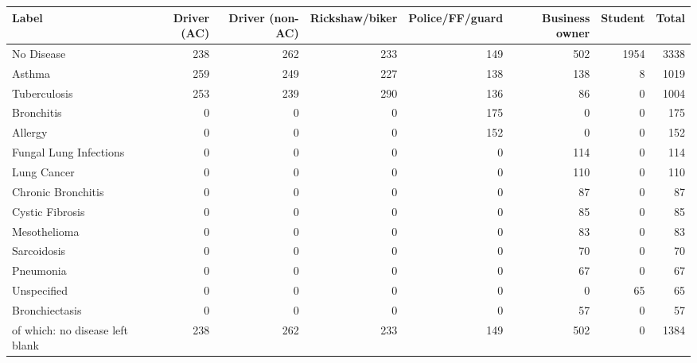 \begin{tabular}{lrrrrrrr}
\toprule
Label & Driver (AC) & Driver (non-AC) & Rickshaw/biker & Police/FF/guard & Business owner & Student & Total \\
\midrule
No Disease & 238 & 262 & 233 & 149 & 502 & 1954 & 3338 \\
Asthma & 259 & 249 & 227 & 138 & 138 & 8 & 1019 \\
Tuberculosis & 253 & 239 & 290 & 136 & 86 & 0 & 1004 \\
Bronchitis & 0 & 0 & 0 & 175 & 0 & 0 & 175 \\
Allergy & 0 & 0 & 0 & 152 & 0 & 0 & 152 \\
Fungal Lung Infections & 0 & 0 & 0 & 0 & 114 & 0 & 114 \\
Lung Cancer & 0 & 0 & 0 & 0 & 110 & 0 & 110 \\
Chronic Bronchitis & 0 & 0 & 0 & 0 & 87 & 0 & 87 \\
Cystic Fibrosis & 0 & 0 & 0 & 0 & 85 & 0 & 85 \\
Mesothelioma & 0 & 0 & 0 & 0 & 83 & 0 & 83 \\
Sarcoidosis & 0 & 0 & 0 & 0 & 70 & 0 & 70 \\
Pneumonia & 0 & 0 & 0 & 0 & 67 & 0 & 67 \\
Unspecified & 0 & 0 & 0 & 0 & 0 & 65 & 65 \\
Bronchiectasis & 0 & 0 & 0 & 0 & 57 & 0 & 57 \\
\midrule
of which: no disease left blank & 238 & 262 & 233 & 149 & 502 & 0 & 1384 \\
\bottomrule
\end{tabular}
